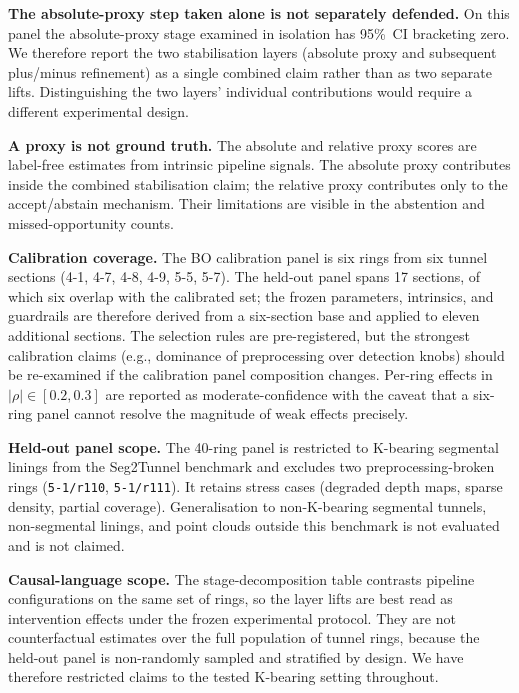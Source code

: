 \documentclass[a4paper,fleqn]{cas-dc}
\begin{document}
\textbf{The absolute-proxy step taken alone is not separately defended.} On this panel the absolute-proxy stage examined in isolation has 95\%~CI bracketing zero. We therefore report the two stabilisation layers (absolute proxy and subsequent plus/minus refinement) as a single combined claim rather than as two separate lifts. Distinguishing the two layers' individual contributions would require a different experimental design.

\textbf{A proxy is not ground truth.} The absolute and relative proxy scores are label-free estimates from intrinsic pipeline signals. The absolute proxy contributes inside the combined stabilisation claim; the relative proxy contributes only to the accept/abstain mechanism. Their limitations are visible in the abstention and missed-opportunity counts.

\textbf{Calibration coverage.} The BO calibration panel is six rings from six tunnel sections (4-1, 4-7, 4-8, 4-9, 5-5, 5-7). The held-out panel spans 17 sections, of which six overlap with the calibrated set; the frozen parameters, intrinsics, and guardrails are therefore derived from a six-section base and applied to eleven additional sections. The selection rules are pre-registered, but the strongest calibration claims (e.g., dominance of preprocessing over detection knobs) should be re-examined if the calibration panel composition changes. Per-ring effects in $|\rho|\in[0.2, 0.3]$ are reported as moderate-confidence with the caveat that a six-ring panel cannot resolve the magnitude of weak effects precisely.

\textbf{Held-out panel scope.} The 40-ring panel is restricted to K-bearing segmental linings from the Seg2Tunnel benchmark and excludes two preprocessing-broken rings (\texttt{5-1/r110}, \texttt{5-1/r111}). It retains stress cases (degraded depth maps, sparse density, partial coverage). Generalisation to non-K-bearing segmental tunnels, non-segmental linings, and point clouds outside this benchmark is not evaluated and is not claimed.

\textbf{Causal-language scope.} The stage-decomposition table contrasts pipeline configurations on the same set of rings, so the layer lifts are best read as intervention effects under the frozen experimental protocol. They are not counterfactual estimates over the full population of tunnel rings, because the held-out panel is non-randomly sampled and stratified by design. We have therefore restricted claims to the tested K-bearing setting throughout.
\end{document}
